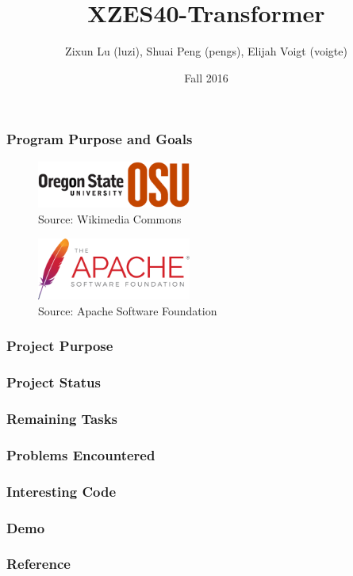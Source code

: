 \documentclass{beamer}
\title{XZES40-Transformer}
\author{Zixun Lu (luzi),
  Shuai Peng (pengs),
  Elijah Voigt (voigte)}
\institute{CS 461 | CS Senior Capstone | Group \#40}
\date{Fall 2016}
\begin{document}
 
\frame{\titlepage}

\begin{frame}
  \frametitle{Program Purpose and Goals }
\begin{figure}
	\centering
    \includegraphics[width=0.45\textwidth]{figures/osu-logo}
    \caption{Source: Wikimedia Commons \cite{osu-logo}}
\end{figure}

\begin{figure}
	\centering
    \includegraphics[width=0.45\textwidth]{figures/asf-logo}
    \caption{Source: Apache Software Foundation \cite{asf-logo}}
\end{figure}
\end{frame}

\begin{frame}
  \frametitle{Project Purpose}
\end{frame}

\begin{frame}
  \frametitle{Project Status}
\end{frame}

\begin{frame}
  \frametitle{Remaining Tasks}
\end{frame}

\begin{frame}
  \frametitle{Problems Encountered}
\end{frame}

\begin{frame}
  \frametitle{Interesting Code}
\end{frame}

\begin{frame}
  \frametitle{Demo}
\end{frame}

\begin{frame}
	\frametitle{Reference}
    \printbibliography
\end{frame}
\end{document}
